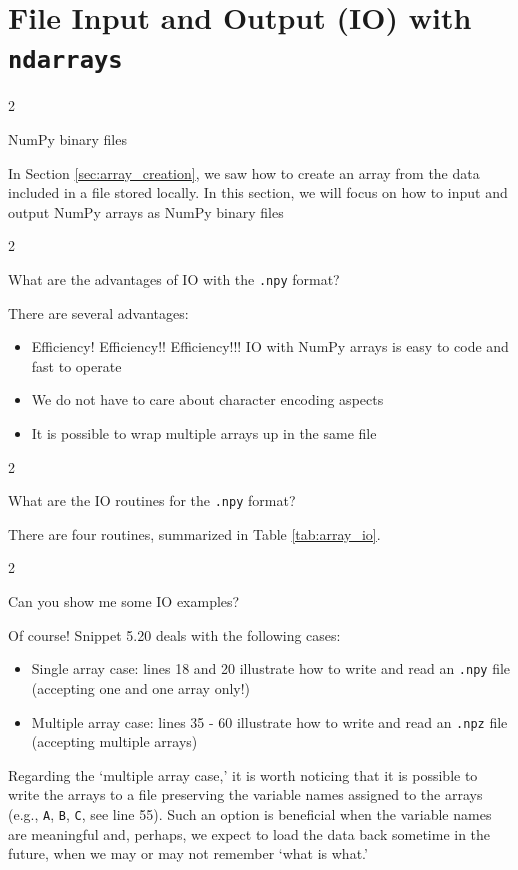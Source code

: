 \documentclass[a4paper,11pt]{book}
\newcommand{\question}[1]{%
    \begin{tcolorbox}[colback=comp_c!10,colframe=comp_c,sidebyside align=top,width=\linewidth,before skip=1ex]
        #1
    \end{tcolorbox}
    \switchcolumn%
}
\newcommand{\note}[1]{%
    \begin{tcolorbox}[colback=white!0,colframe=white!10,width=\linewidth,before skip=1ex]
        #1
    \end{tcolorbox}
}
\begin{document}
\section{File Input and Output (IO) with \texttt{ndarrays}}

\begin{paracol}{2}
	\question{\raggedright NumPy binary files}
	\note{In Section \ref{sec:array_creation}, we saw how to create an array from the data included in a file stored locally. In this section, we will focus on how to input and output NumPy arrays as NumPy binary files}
\end{paracol}

\begin{paracol}{2}
	\question{\raggedright What are the advantages of IO with the \texttt{.npy} format?}
	\note{There are several advantages:
	\begin{itemize}
		\item Efficiency! Efficiency!! Efficiency!!! IO with NumPy arrays is easy to code and fast to operate
		\item We do not have to care about character encoding aspects
		\item It is possible to wrap multiple arrays up in the same file
	\end{itemize}
	}
\end{paracol}

\begin{paracol}{2}
	\question{\raggedright What are the IO routines for the \texttt{.npy} format?}
	\note{There are four routines, summarized in Table \ref{tab:array_io}.}
\end{paracol}

\begin{paracol}{2}
	\question{\raggedright Can you show me some IO examples?}
	\note{Of course! Snippet 5.20 deals with the following cases:
	
	\begin{itemize}
		\item Single array case: lines 18 and 20 illustrate how to write and read an \texttt{.npy} file (accepting one and one array only!)
		\item Multiple array case: lines 35 - 60 illustrate how to write and read an \texttt{.npz} file (accepting multiple arrays)
	\end{itemize}

	\quad Regarding the `multiple array case,' it is worth noticing that it is possible to write the arrays to a file preserving the variable names assigned to the arrays (e.g., \texttt{A}, \texttt{B}, \texttt{C}, see line 55). Such an option is beneficial when the variable names are meaningful and, perhaps, we expect to load the data back sometime in the future, when we may or may not remember `what is what.'
	}
\end{paracol}
\end{document}
